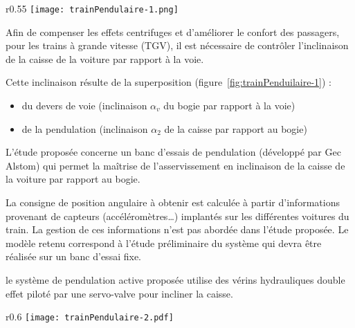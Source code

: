 % 

\begin{Exo}[name={Devoir},title={Système de pendulation},origin={Adapté de Centrale MP 2000},label={exo:CentralePendulation}]




\begin{wrapfigure}[21]{r}{0.55\textwidth}
\centering
\texttt{[image: trainPendulaire-1.png]}
\caption{Principe de la pendulation}
\label{fig:trainPenduilaire-1}
\end{wrapfigure}

Afin de compenser les effets centrifuges et d’améliorer le confort des passagers, pour les trains à grande vitesse (TGV), il est nécessaire de contrôler l’inclinaison de la caisse de la voiture par rapport à la voie.

Cette inclinaison résulte de la superposition (figure~\ref{fig:trainPenduilaire-1}) :
\begin{itemize}
\item du devers de voie (inclinaison $\alpha_v$  du bogie par rapport à la voie) 
\item	de la pendulation (inclinaison $\alpha_2$ de la caisse par rapport au bogie) 

\end{itemize}



L’étude proposée concerne un banc d’essais de pendulation (développé par Gec Alstom) qui permet la maîtrise de l’asservissement en inclinaison de la caisse de la voiture par rapport au bogie.

La consigne de position angulaire à obtenir est calculée à partir d’informations provenant de capteurs (accéléromètres\dots) implantés sur les différentes voitures du train. La gestion de ces informations n’est pas abordée dans l’étude proposée. Le modèle retenu correspond à l’étude préliminaire du système qui devra être réalisée sur un banc d’essai fixe.

le système de pendulation active proposée utilise des vérins hydrauliques double effet piloté par une servo-valve pour incliner la caisse.



\begin{wrapfigure}[15]{r}{0.6\textwidth}
\centering
\texttt{[image: trainPendulaire-2.pdf]}

\caption{Schéma de principe du banc d'essai}
\label{fig:trainPendulaire-2}
\end{wrapfigure}


\end{Exo}
